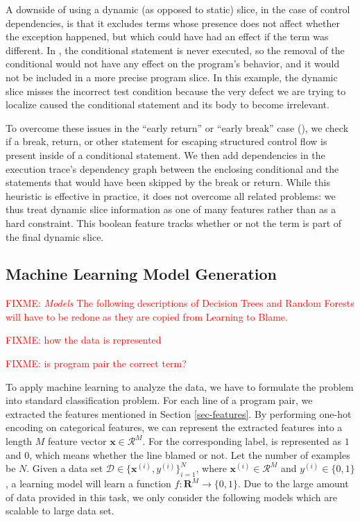 \documentclass[conference]{IEEEtran}
\newcommand{\fixme}[1]{\textcolor{red}{FIXME: #1}}
\begin{document}
A downside of using a dynamic (as opposed to static) slice, in the case of
control dependencies, is that it excludes terms whose presence does not
affect whether the exception happened, but which could have had an effect
if the term was different. In
, the conditional statement is never
executed, so the removal of the conditional would not have any effect on
the program's behavior, and it would not be included in a more precise
program slice. In this example, the dynamic slice misses the incorrect
test condition because the very defect we are trying to localize
caused the conditional statement and its body to become irrelevant.

To overcome these issues in the ``early return'' or ``early break'' case
(), we check if a break, return, or other statement for
escaping structured control flow is present inside of a conditional
statement. We then add dependencies in the execution trace's dependency graph
between the enclosing conditional and the statements that would have been skipped
by the break or return. While this heuristic is effective in practice, it
does not overcome all related problems: we thus treat dynamic slice
information as one of many features rather than as a hard constraint.
This boolean feature tracks whether or not the term is part of the final
dynamic slice.

\subsection{Machine Learning Model Generation}
\label{sec-model}

\fixme{
\emph{Models} The following descriptions of Decision Trees and
Random Forests will have to be redone as they are copied from Learning to Blame.
}

\fixme{how the data is represented}

\fixme{is program pair the correct term?}

To apply machine learning to analyze the data, we have to formulate the
problem into standard classification problem.
For each line of a program pair, we extracted the features mentioned in
Section \ref{sec-features}.
By performing one-hot encoding on categorical features, we can represent the
extracted features into a length $M$ feature vector $\mathbf{x} \in
\mathcal{R}^{M}$.
For the corresponding label, is represented as $1$ and $0$, which means whether
the line blamed or not.
Let the number of examples be $N$.
Given a data set $\mathcal{D} \in \{\mathbf{x}^{(i)}, y^{(i)}\}^{N}_{i=1}$,
where $\mathbf{x}^{(i)} \in \mathcal{R}^{M}$ and $y^{(i)} \in \{0, 1\}$,
a learning model will learn a function $f: \mathbf{R}^{M} \to \{0, 1\}$.
Due to the large amount of data provided in this task, we only consider the
following models which are scalable to large data set.
\end{document}
